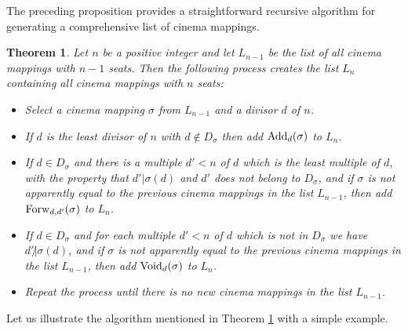 \documentclass{amsart}
\newtheorem{theorem}{Theorem}[section]
\theoremstyle{definition}
\begin{document}
The preceding proposition provides a straightforward recursive algorithm for generating a comprehensive list of cinema mappings.

\begin{theorem}\label{alg}
Let $n$ be a positive integer and let $L_{n-1}$ be the list of all cinema mappings with $n-1$ seats. Then the following process creates the list $L_n$ containing all cinema mappings with $n$ seats:
\begin{itemize}
\item Select a cinema mapping $\sigma$ from $L_{n-1}$ and a divisor $d$ of $n$.
\item If $d$ is the least divisor of $n$ with $d\notin D_\sigma$ then add ${\rm Add}_d(\sigma)$ to $L_n$.
\item If $d\in D_\sigma$ and there is a multiple $d'<n$ of $d$ which is the least multiple of $d$, with the property that $d'|\sigma(d)$ and $d'$ does not belong to $D_\sigma$, and if $\sigma$ is not apparently equal to the previous cinema mappings in the list $L_{n-1}$, then add ${\rm Forw}_{d,d'}(\sigma)$ to $L_n$.
\item If $d\in D_\sigma$ and for each multiple $d'<n$ of $d$ which is not in $D_\sigma$ we have $d'\not| \sigma(d)$, and if $\sigma$ is not apparently equal to the previous cinema mappings in the list $L_{n-1}$, then add ${\rm Void}_d(\sigma)$ to $L_n$.
\item Repeat the process until there is no new cinema mappings in the list $L_{n-1}$.
\end{itemize}
\end{theorem}

Let us illustrate the algorithm mentioned in Theorem \ref{alg} with a simple example.
\end{document}

